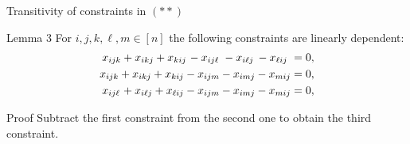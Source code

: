 \documentclass[xcolor=dvipsnames]{beamer}
\numberwithin{bsp}{section}
\numberwithin{figure}{section}
\begin{document}
\begin{frame}{Transitivity of constraints in $(**)$}
	\begin{block}{Lemma 3}
		For $i,j,k,\ell,m \in [n]$ the following constraints are linearly dependent:
		\vspace{-5 pt}
		\begin{align*}
		x_{ijk} + x_{ikj} + x_{kij} \hspace{1 pt} - x_{ij\ell} \hspace{3 pt} - x_{i\ell j} \hspace{2 pt} - x_{\ell ij} \hspace{3 pt} &= 0, \\
		x_{ijk} + x_{ikj} + x_{kij} - x_{ijm} - x_{imj} - x_{mij} &= 0, \\
		x_{ij\ell} \hspace{1 pt} + x_{i\ell j} + x_{\ell ij} - x_{ijm} - x_{imj} - x_{mij} &= 0,
		\end{align*} 
	\end{block}
	
	\begin{block}{Proof}
		Subtract the first constraint from the second one to obtain the third constraint.
	\end{block}
\end{frame}
\end{document}
